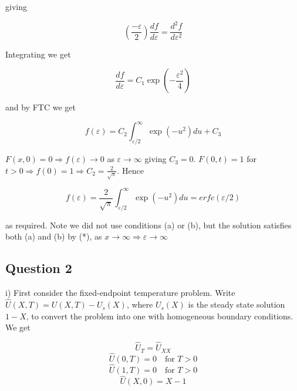 \documentclass[10pt,a4paper]{report}
\begin{document}
giving

\begin{equation*}
(\frac{-\varepsilon}{2})\frac{df}{d\varepsilon} = \frac{d^2f}{d\varepsilon^2}
\end{equation*}

Integrating we get 

\begin{equation*}
\frac{df}{d\varepsilon} = C_1\exp(-\frac{\varepsilon^2}{4})
\end{equation*}

and by FTC we get 

\begin{equation*}
f(\varepsilon) = C_2\int_{\varepsilon/2}^{\infty}\exp(-u^2)du + C_3
\end{equation*}

$F(x,0)=0 \Rightarrow f(\varepsilon) \rightarrow 0$ as $\varepsilon \rightarrow \infty$ giving $C_3=0$. $F(0,t)=1$ for $t>0 \Rightarrow f(0)=1 \Rightarrow C_2=\frac{2}{\sqrt{\pi}}$. Hence

\begin{equation*}
f(\varepsilon) = \frac{2}{\sqrt{\pi}} \int_{\varepsilon/2}^{\infty}\exp(-u^2)du = erfc(\varepsilon/2)
\end{equation*}

as required. Note we did not use conditions (a) or (b), but the solution satisfies both (a) and (b) by (*), as $x\rightarrow\infty\Rightarrow\varepsilon\rightarrow\infty$


\subsection*{Question 2}

i) First consider the fixed-endpoint temperature problem. Write $\hat{U}(X,T)=U(X,T)-U_s(X)$, where $U_s(X)$ is the steady state solution $1-X$, to convert the problem into one with homogeneous boundary conditions. We get

\begin{equation*}
\hat{U}_T=\hat{U}_{XX} 
\end{equation*}
\begin{equation*}
\hat{U}(0,T)=0 \quad \text{for }T>0
\end{equation*}
\begin{equation*}
\hat{U}(1,T)=0 \quad \text{for }T>0
\end{equation*}
\begin{equation*}
\hat{U}(X,0)=X-1 \tag{**}
\end{equation*}
\end{document}
